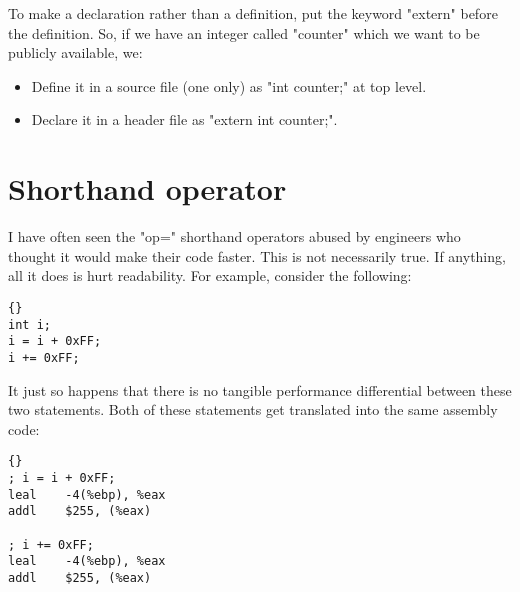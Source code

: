 \documentclass{report}
\begin{document}
To make a declaration rather than a definition, put the keyword "extern" before the definition. So, if we have an integer called "counter" which we want to be publicly available, we:
\begin{itemize}
\item Define it in a source file (one only) as "int counter;" at top level.
\item Declare it in a header file as "extern int counter;". 
\end{itemize}

\section{Shorthand operator}
I have often seen the "op=" shorthand operators abused by engineers who thought it would make their code faster. This is not necessarily true. If anything, all it does is hurt readability. For example, consider the following:
\begin{lstlisting}{}
int i;
i = i + 0xFF;
i += 0xFF;
\end{lstlisting}
It just so happens that there is no tangible performance differential between these two statements. Both of these statements get translated into the same assembly code:
\begin{lstlisting}{}
; i = i + 0xFF;
leal	-4(%ebp), %eax
addl	$255, (%eax)

; i += 0xFF;
leal	-4(%ebp), %eax
addl	$255, (%eax)
\end{lstlisting}



\end{document}
